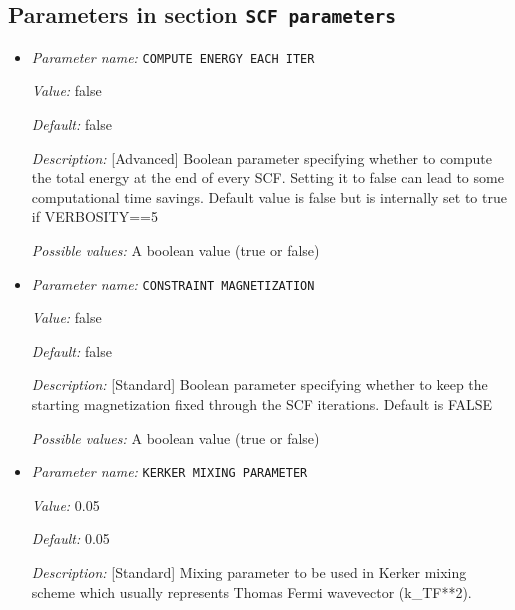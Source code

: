 \subsection{Parameters in section \tt SCF parameters}
\label{parameters:SCF_20parameters}

\begin{itemize}
\item {\it Parameter name:} {\tt COMPUTE ENERGY EACH ITER}
\label{parameters:SCF parameters/COMPUTE ENERGY EACH ITER}
\label{parameters:SCF_20parameters/COMPUTE_20ENERGY_20EACH_20ITER}


{\it Value:} false


{\it Default:} false


{\it Description:} [Advanced] Boolean parameter specifying whether to compute the total energy at the end of every SCF. Setting it to false can lead to some computational time savings. Default value is false but is internally set to true if VERBOSITY==5


{\it Possible values:} A boolean value (true or false)
\item {\it Parameter name:} {\tt CONSTRAINT MAGNETIZATION}
\label{parameters:SCF parameters/CONSTRAINT MAGNETIZATION}
\label{parameters:SCF_20parameters/CONSTRAINT_20MAGNETIZATION}


{\it Value:} false


{\it Default:} false


{\it Description:} [Standard] Boolean parameter specifying whether to keep the starting magnetization fixed through the SCF iterations. Default is FALSE


{\it Possible values:} A boolean value (true or false)
\item {\it Parameter name:} {\tt KERKER MIXING PARAMETER}
\label{parameters:SCF parameters/KERKER MIXING PARAMETER}
\label{parameters:SCF_20parameters/KERKER_20MIXING_20PARAMETER}


{\it Value:} 0.05


{\it Default:} 0.05


{\it Description:} [Standard] Mixing parameter to be used in Kerker mixing scheme which usually represents Thomas Fermi wavevector (k_{TF}**2).



\end{itemize}
